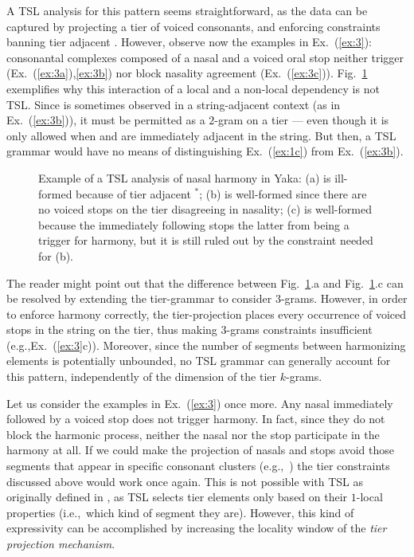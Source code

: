 \documentclass[11pt,a4paper]{article}
\begin{document}
A TSL analysis for this pattern seems straightforward, as the data can be captured by projecting a tier of voiced consonants, and enforcing constraints banning tier adjacent  \textipa{[nd]}.\@
However, observe now the examples in  Ex.~(\ref{ex:3}): consonantal complexes composed of a nasal and a voiced oral stop neither trigger  (Ex.~(\ref{ex:3a}),\ref{ex:3b}) nor block nasality agreement  (Ex.~(\ref{ex:3c})).\@
Fig.~\ref{fig:YAKA1} exemplifies why this interaction of a local and a non-local dependency is not TSL\@. 
Since \textipa{[nd]} is sometimes observed in a string-adjacent context (as in Ex.~(\ref{ex:3b})), it must be permitted as a $2$-gram on a tier --- even though it is only allowed when  \textipa{[n]} and \textipa{[d]} are immediately adjacent in the string.
But then,  a TSL grammar would have no means of distinguishing Ex.~(\ref{ex:1c}) from Ex.~(\ref{ex:3b}).

\begin{figure}[htbp]
\centering
        
        
        \caption{Example of a TSL analysis of nasal harmony in Yaka: (a) is ill-formed because of tier adjacent $^*$\textipa{[nd]}; (b) is well-formed since  there are no voiced stops on the tier disagreeing in nasality; (c) is well-formed because the \textipa{[d]} immediately following \textipa{[n]} stops the latter from being a trigger for harmony, but it is still ruled out by the constraint needed for (b).}
        \label{fig:YAKA1}
        \end{figure}

The reader might point out that the difference between Fig.~\ref{fig:YAKA1}.a and Fig.~\ref{fig:YAKA1}.c can be resolved by extending the tier-grammar to consider $3$-grams.
However, in order to enforce harmony correctly, the tier-projection places every occurrence of voiced stops in the string on the tier, thus making $3$-grams constraints insufficient (e.g.,Ex.~(\ref{ex:3}c)).
Moreover, since the number of segments between harmonizing elements is potentially unbounded, no TSL grammar can generally account for this pattern, independently of the dimension of the tier $k$-grams.

Let us consider the examples in Ex.~(\ref{ex:3}) once more. 
Any nasal immediately followed by a voiced stop does not trigger harmony. 
In fact, since they do not block the harmonic process, neither the nasal nor the stop participate in the harmony at all.
If we could make the projection of nasals and stops avoid  those segments that appear in specific consonant clusters (e.g.,~\textipa{[nd]}) the tier constraints discussed above would work once again.
This is not possible with TSL as originally defined in \cite{HeinzRawalTanner}, as TSL selects tier elements only based on their $1$-local properties (i.e.,~which kind of segment they are). %
However, this kind of expressivity can be accomplished by increasing the locality window of the \emph{tier projection mechanism}. 
\end{document}
